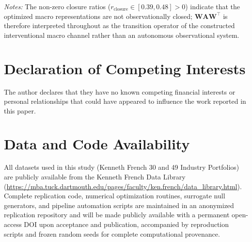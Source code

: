 \documentclass[review,12pt,authoryear]{elsarticle}
\begin{document}
\begin{table}[htbp]
\centering
\caption{Observational Closure Diagnostics at Optimal Macro-Dimension $q^*$.}
\label{tab:closure_diagnostics}
\begin{minipage}{\textwidth}
\vspace{4pt}
\scriptsize \emph{Notes:} The non-zero closure ratios ($r_{\mathrm{closure}} \in [0.39, 0.48] > 0$) indicate that the optimized macro representations are not observationally closed; $\mathbf{W}\mathbf{A}\mathbf{W}^\top$ is therefore interpreted throughout as the transition operator of the constructed interventional macro channel rather than an autonomous observational system.
\end{minipage}
\end{table}

\section*{Declaration of Competing Interests}
The author declares that they have no known competing financial interests or personal relationships that could have appeared to influence the work reported in this paper.

\section*{Data and Code Availability}
All datasets used in this study (Kenneth French 30 and 49 Industry Portfolios) are publicly available from the Kenneth French Data Library (\url{https://mba.tuck.dartmouth.edu/pages/faculty/ken.french/data_library.html}). Complete replication code, numerical optimization routines, surrogate null generators, and pipeline automation scripts are maintained in an anonymized replication repository and will be made publicly available with a permanent open-access DOI upon acceptance and publication, accompanied by reproduction scripts and frozen random seeds for complete computational provenance.
\end{document}
